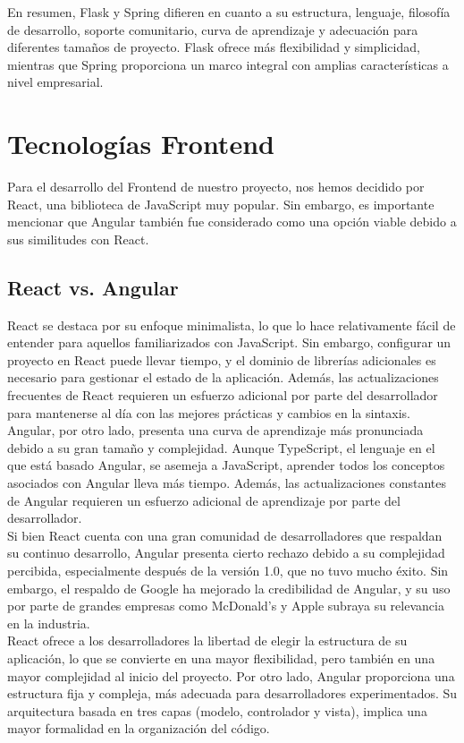 En resumen, Flask y Spring difieren en cuanto a su estructura, lenguaje, filosofía de desarrollo, soporte comunitario, curva de aprendizaje y adecuación para diferentes tamaños de proyecto. Flask ofrece más flexibilidad y simplicidad, mientras que Spring proporciona un marco integral con amplias características a nivel empresarial.
\section{Tecnologías Frontend}
Para el desarrollo del Frontend de nuestro proyecto, nos hemos decidido por React, una biblioteca de JavaScript muy popular. Sin embargo, es importante mencionar que Angular también fue considerado como una opción viable debido a sus similitudes con React.

\subsection{React vs. Angular}
React se destaca por su enfoque minimalista, lo que lo hace relativamente fácil de entender para aquellos familiarizados con JavaScript. Sin embargo, configurar un proyecto en React puede llevar tiempo, y el dominio de librerías adicionales es necesario para gestionar el estado de la aplicación. Además, las actualizaciones frecuentes de React requieren un esfuerzo adicional por parte del desarrollador para mantenerse al día con las mejores prácticas y cambios en la sintaxis.\\

Angular, por otro lado, presenta una curva de aprendizaje más pronunciada debido a su gran tamaño y complejidad. Aunque TypeScript, el lenguaje en el que está basado Angular, se asemeja a JavaScript, aprender todos los conceptos asociados con Angular lleva más tiempo. Además, las actualizaciones constantes de Angular requieren un esfuerzo adicional de aprendizaje por parte del desarrollador.\\

Si bien React cuenta con una gran comunidad de desarrolladores que respaldan su continuo desarrollo, Angular presenta cierto rechazo debido a su complejidad percibida, especialmente después de la versión 1.0, que no tuvo mucho éxito. Sin embargo, el respaldo de Google ha mejorado la credibilidad de Angular, y su uso por parte de grandes empresas como McDonald's y Apple subraya su relevancia en la industria.\\

React ofrece a los desarrolladores la libertad de elegir la estructura de su aplicación, lo que se convierte en una mayor flexibilidad, pero también en una mayor complejidad al inicio del proyecto. Por otro lado, Angular proporciona una estructura fija y compleja, más adecuada para desarrolladores experimentados. Su arquitectura basada en tres capas (modelo, controlador y vista), implica una mayor formalidad en la organización del código.\\

